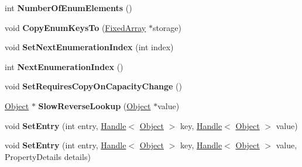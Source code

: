 \begin{DoxyCompactItemize}
\item 
int {\bfseries Number\+Of\+Enum\+Elements} ()\hypertarget{classv8_1_1internal_1_1_dictionary_a704fbe365b3bcd68e9e59c272a30fe23}{}\label{classv8_1_1internal_1_1_dictionary_a704fbe365b3bcd68e9e59c272a30fe23}

\item 
void {\bfseries Copy\+Enum\+Keys\+To} (\hyperlink{classv8_1_1internal_1_1_fixed_array}{Fixed\+Array} $\ast$storage)\hypertarget{classv8_1_1internal_1_1_dictionary_ac64cb197e3683cd3a26d929fa61768d4}{}\label{classv8_1_1internal_1_1_dictionary_ac64cb197e3683cd3a26d929fa61768d4}

\item 
void {\bfseries Set\+Next\+Enumeration\+Index} (int index)\hypertarget{classv8_1_1internal_1_1_dictionary_a77837a47ebe1937fd3b0cccc2b2fbd4b}{}\label{classv8_1_1internal_1_1_dictionary_a77837a47ebe1937fd3b0cccc2b2fbd4b}

\item 
int {\bfseries Next\+Enumeration\+Index} ()\hypertarget{classv8_1_1internal_1_1_dictionary_af1df140b75b3e96cb9211faca31c7f8f}{}\label{classv8_1_1internal_1_1_dictionary_af1df140b75b3e96cb9211faca31c7f8f}

\item 
void {\bfseries Set\+Requires\+Copy\+On\+Capacity\+Change} ()\hypertarget{classv8_1_1internal_1_1_dictionary_a6a02651858ecdf58b917c5a8ec9641ef}{}\label{classv8_1_1internal_1_1_dictionary_a6a02651858ecdf58b917c5a8ec9641ef}

\item 
\hyperlink{classv8_1_1internal_1_1_object}{Object} $\ast$ {\bfseries Slow\+Reverse\+Lookup} (\hyperlink{classv8_1_1internal_1_1_object}{Object} $\ast$value)\hypertarget{classv8_1_1internal_1_1_dictionary_ac4e09479a5db5eeb3fc72b24c5af1325}{}\label{classv8_1_1internal_1_1_dictionary_ac4e09479a5db5eeb3fc72b24c5af1325}

\item 
void {\bfseries Set\+Entry} (int entry, \hyperlink{classv8_1_1internal_1_1_handle}{Handle}$<$ \hyperlink{classv8_1_1internal_1_1_object}{Object} $>$ key, \hyperlink{classv8_1_1internal_1_1_handle}{Handle}$<$ \hyperlink{classv8_1_1internal_1_1_object}{Object} $>$ value)\hypertarget{classv8_1_1internal_1_1_dictionary_a7c06c3dbd747928f8f7f93ffbebc331a}{}\label{classv8_1_1internal_1_1_dictionary_a7c06c3dbd747928f8f7f93ffbebc331a}

\item 
void {\bfseries Set\+Entry} (int entry, \hyperlink{classv8_1_1internal_1_1_handle}{Handle}$<$ \hyperlink{classv8_1_1internal_1_1_object}{Object} $>$ key, \hyperlink{classv8_1_1internal_1_1_handle}{Handle}$<$ \hyperlink{classv8_1_1internal_1_1_object}{Object} $>$ value, Property\+Details details)\hypertarget{classv8_1_1internal_1_1_dictionary_a5ffecfeed3054083564312029b8b0dd0}{}\label{classv8_1_1internal_1_1_dictionary_a5ffecfeed3054083564312029b8b0dd0}

\end{DoxyCompactItemize}
